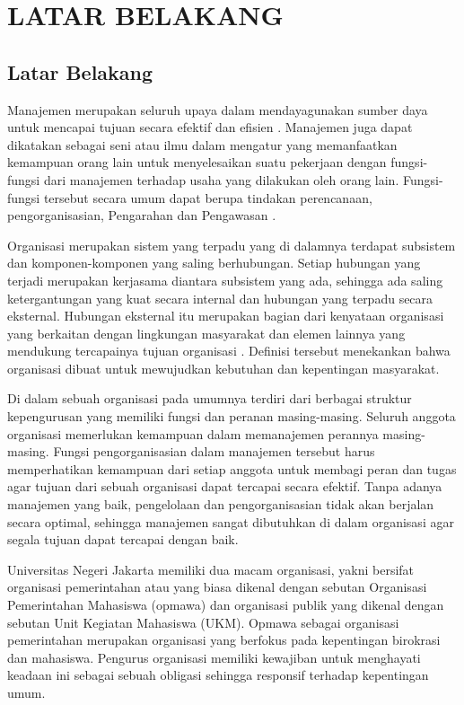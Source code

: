 
\chapter{LATAR BELAKANG}

\section{Latar Belakang}
Manajemen merupakan seluruh upaya dalam mendayagunakan sumber daya untuk mencapai tujuan secara efektif dan efisien \cite{rifai}. Manajemen juga dapat dikatakan sebagai seni atau ilmu dalam mengatur yang memanfaatkan kemampuan orang lain untuk menyelesaikan suatu pekerjaan dengan fungsi-fungsi dari manajemen terhadap usaha yang dilakukan oleh orang lain. Fungsi-fungsi tersebut secara umum dapat berupa tindakan perencanaan, pengorganisasian, Pengarahan dan Pengawasan \cite{rachman}.

Organisasi merupakan sistem yang terpadu yang di dalamnya terdapat subsistem dan komponen-komponen yang saling berhubungan. Setiap hubungan yang terjadi merupakan kerjasama diantara subsistem yang ada, sehingga ada saling ketergantungan yang kuat secara internal dan hubungan yang terpadu secara eksternal. Hubungan eksternal itu merupakan bagian dari kenyataan organisasi yang berkaitan dengan lingkungan masyarakat dan elemen lainnya yang mendukung tercapainya tujuan organisasi \cite{priansa}. Definisi tersebut menekankan bahwa organisasi dibuat untuk mewujudkan kebutuhan dan kepentingan masyarakat.

Di dalam sebuah organisasi pada umumnya terdiri dari berbagai struktur kepengurusan yang memiliki fungsi dan peranan masing-masing. Seluruh anggota organisasi memerlukan kemampuan dalam memanajemen perannya masing-masing. Fungsi pengorganisasian dalam manajemen tersebut harus memperhatikan kemampuan dari setiap anggota untuk membagi peran dan tugas agar tujuan dari sebuah organisasi dapat tercapai secara efektif. Tanpa adanya manajemen yang baik, pengelolaan dan pengorganisasian tidak akan berjalan secara optimal, sehingga manajemen sangat dibutuhkan di dalam organisasi agar segala tujuan dapat tercapai dengan baik.

Universitas Negeri Jakarta memiliki dua macam organisasi, yakni bersifat organisasi pemerintahan atau yang biasa dikenal dengan sebutan Organisasi Pemerintahan Mahasiswa (opmawa) dan organisasi publik yang dikenal dengan sebutan Unit Kegiatan Mahasiswa (UKM). Opmawa sebagai organisasi pemerintahan merupakan organisasi yang berfokus pada kepentingan birokrasi dan mahasiswa. Pengurus organisasi memiliki kewajiban untuk menghayati keadaan ini sebagai sebuah obligasi sehingga responsif terhadap kepentingan umum.

